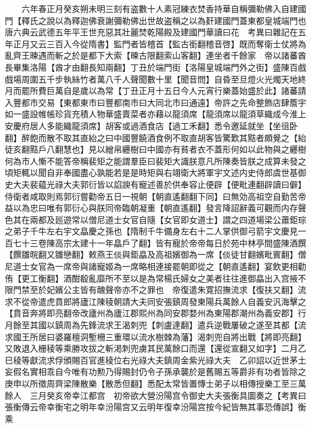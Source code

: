 　　六年春正月癸亥朔未明三刻有盗數十人素冠練衣焚香持華自稱彌勒佛入自建國門【釋氏之說以為釋迦佛衰謝彌勒佛出世故盗稱之以為姧建國門蓋東都皇城端門也唐六典云武德五年平王世充惡其壯麗焚乾陽殿及建國門華讀曰花　考異曰雜記在五年正月又云三百入今從隋書】監門者皆稽首【監古銜翻稽音啓】既而奪衛士仗將為亂齊王暕遇而斬之於是都下大索【暕古限翻索山客翻】連坐者千餘家　帝以諸蕃酋長畢集洛陽【酋才由翻長知兩翻】丁丑於端門街【洛陽皇城端門外之街】盛陳百戲戲場周圍五千步執絲竹者萬八千人聲聞數十里【聞音問】自昏至旦燈火光燭天地終月而罷所費巨萬自是歲以為常【丁丑正月十五日今人元宵行樂蓋始盛於此】諸蕃請入豐都市交易【東都東市曰豐都南市曰大同北市曰通遠】帝許之先命整飾店肆簷宇如一盛設帷帳珍貨充積人物華盛賣菜者亦藉以龍須席【龍須席以龍須草織成今淮上安慶府居人多能織龍須席】胡客或過酒食店【過工禾翻】悉令邀延就坐【坐徂卧翻】醉飽而散不取其直紿之曰中國豐饒酒食例不取直胡客皆驚歎其黠者頗覺之【紿徒亥翻黠戶八翻慧也】見以繒帛纒樹曰中國亦有貧者衣不蓋形何如以此物與之纒樹何為市人慚不能答帝稱裴矩之能謂羣臣曰裴矩大識朕意凡所陳奏皆朕之成算未發之頃矩輒以聞自非奉國盡心孰能若是是時矩與右翊衛大將軍宇文述内史侍郎虞世基御史大夫裴藴光祿大夫郭衍皆以諂諛有寵述善於供奉容止便辟【便毗連翻辟讀曰僻】侍衛者咸取則焉郭衍嘗勸帝五日一視朝【朝直遙翻翻下同】曰無効高祖空自勤苦帝益以為忠曰唯有郭衍心與朕同帝臨朝凝重【朝直遙翻】發言降詔辭義可觀而内存聲色其在兩都及廵遊常以僧尼道士女官自隨【女官即女道士】謂之四道場梁公蕭鉅琮之弟子千牛左右宇文皛慶之孫也【隋制千牛備身左右十二人掌供御弓箭宇文慶見一百七十三卷陳高宗太建十一年皛戶了翻】皆有寵於帝帝每日於苑中林亭間盛陳酒饌【饌雛晥翻又雛戀翻】敕燕王倓與鉅皛及高祖嬪御為一席【倓徒甘翻嬪毗賓翻】僧尼道士女官為一席帝與諸寵姬為一席略相連接罷朝即從之【朝直遙翻】宴飲更相勸侑【更工衡翻】酒酣殽亂靡所不至以是為常楊氏婦女之美者往往進御皛出入宫掖不限門禁至於妃嬪公主皆有醜聲帝亦不之罪也　帝復遣朱寛招撫流求【復扶又翻】流求不從帝遣虎賁郎將廬江陳稜朝請大夫同安張鎮周發東陽兵萬餘人自義安汎海擊之【賁音奔將即亮翻帝改廬州為廬江郡熙州為同安郡婺州為東陽郡潮州為義安郡】行月餘至其國以鎮周為先鋒流求王渴刺兜【刺盧達翻】遣兵逆戰屢破之遂至其都【流求國王所居曰婆羅檀洞塹柵三重環以流水樹棘為藩】渴刺兜自將出戰【將即亮翻】又敗退入栅稜等乘勝攻拔之斬渇刺兜虜其民萬餘口而還【還從宣翻又如字】二月乙巳稜等獻流求俘頒賜百官進稜位右光祿大夫鎮周金紫光祿大夫　乙卯詔以近世茅土妄假名實相乖自今唯有功勲乃得賜封仍令子孫承襲於是舊賜五等爵非有功者皆除之　庚申以所徵周齊梁陳散樂【散悉但翻】悉配太常皆置慱士弟子以相傳授樂工至三萬餘人　三月癸亥帝幸江都宫　初帝欲大營汾陽宫令御史大夫張衡具圖奏之【考異曰張衡傳云帝幸衡宅之明年幸汾陽宫又云明年復幸汾陽宫按今紀皆無其事恐傳誤】衡乘

